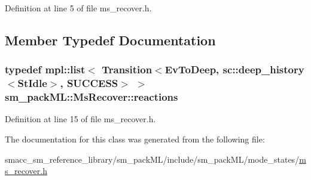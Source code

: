 Definition at line 5 of file ms\+\_\+recover.\+h.



\subsection{Member Typedef Documentation}
\subsubsection[{\texorpdfstring{reactions}{reactions}}]{\setlength{\rightskip}{0pt plus 5cm}typedef mpl\+::list$<$ Transition$<${\bf Ev\+To\+Deep}, sc\+::deep\+\_\+history$<${\bf St\+Idle}$>$, {\bf S\+U\+C\+C\+E\+SS}$>$ $>$ {\bf sm\+\_\+pack\+M\+L\+::\+Ms\+Recover\+::reactions}}\hypertarget{classsm__packML_1_1MsRecover_a8bffec774dd169681986307bed44350c}{}\label{classsm__packML_1_1MsRecover_a8bffec774dd169681986307bed44350c}


Definition at line 15 of file ms\+\_\+recover.\+h.



The documentation for this class was generated from the following file\+:\begin{DoxyCompactItemize}
\item 
smacc\+\_\+sm\+\_\+reference\+\_\+library/sm\+\_\+pack\+M\+L/include/sm\+\_\+pack\+M\+L/mode\+\_\+states/\hyperlink{sm__packML_2include_2sm__packML_2mode__states_2ms__recover_8h}{ms\+\_\+recover.\+h}\end{DoxyCompactItemize}
